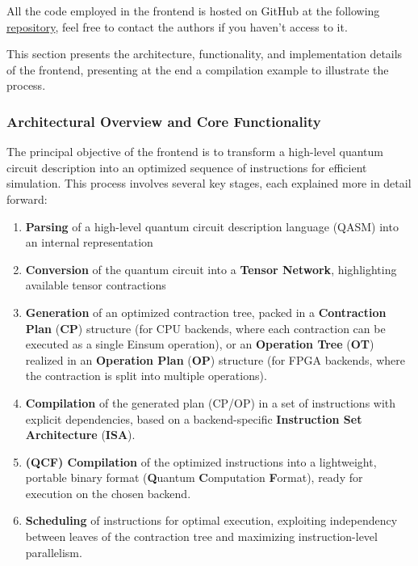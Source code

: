\documentclass[12pt,oneside,a4paper]{article}
\begin{document}
All the code employed in the frontend is hosted on GitHub at the following \href{https://github.com/federico123579/HPPS24-Quantum-Simulation}{repository}, feel free to contact the authors if you haven't access to it.

This section presents the architecture, functionality, and implementation details of the frontend, presenting at the end a compilation example to illustrate the process.

\subsubsection{Architectural Overview and Core Functionality}

The principal objective of the frontend is to transform a high-level quantum circuit description into an optimized sequence of instructions for efficient simulation. This process involves several key stages, each explained more in detail forward:

\begin{enumerate}
    \item \textbf{Parsing} of a high-level quantum circuit description language (QASM) into an internal representation
    \item \textbf{Conversion} of the quantum circuit into a \textbf{Tensor Network}, highlighting available tensor contractions
    \item \textbf{Generation} of an optimized contraction tree, packed in a \textbf{Contraction Plan} (\textbf{CP}) structure (for CPU backends, where each contraction can be executed as a single Einsum operation), or an \textbf{Operation Tree} (\textbf{OT}) realized in an \textbf{Operation Plan} (\textbf{OP}) structure (for FPGA backends, where the contraction is split into multiple operations).
    \item \textbf{Compilation} of the generated plan (CP/OP) in a set of instructions with explicit dependencies, based on a backend-specific \textbf{Instruction Set Architecture} (\textbf{ISA}).
    \item \textbf{(QCF) Compilation} of the optimized instructions into a lightweight, portable binary format (\textbf{Q}uantum \textbf{C}omputation \textbf{F}ormat), ready for execution on the chosen backend.
    \item \textbf{Scheduling} of instructions for optimal execution, exploiting independency between leaves of the contraction tree and maximizing instruction-level parallelism.
\end{enumerate}
\end{document}
